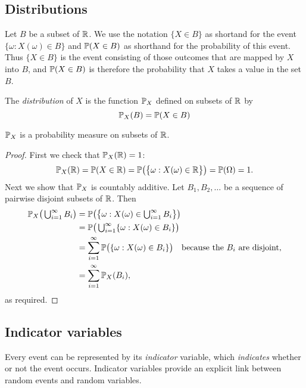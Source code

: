\subsection{Distributions}\label{ss:dist}

Let $B$ be a subset of $\mathbb{R}$. We use the notation $\{X\in B\}$ as shortand for the event $\{\omega: X(\omega)\in B\}$ and $\mathbb{P}(X\in B)$ as shorthand for the probability of this event. Thus $\{X\in B\}$ is the event consisting of those outcomes that are mapped by $X$ into $B$, and $\mathbb{P}(X\in B)$ is therefore the probability that $X$ takes a value in the set $B$.

\begin{definition}\label{def:distribution}
The \emph{distribution} of $X$ is the function $\mathbb{P}_X$ defined on subsets of $\mathbb{R}$ by 
\[
\mathbb{P}_X(B) = \mathbb{P}(X\in B) 
\]
\end{definition}

\begin{theorem}\label{th:distribution}
$\mathbb{P}_X$ is a probability measure on subsets of $\mathbb{R}$.
\begin{proof}
First we check that $\mathbb{P}_X(\mathbb{R}) = 1$:
\[
\mathbb{P}_X(\mathbb{R}) = \mathbb{P}(X\in\mathbb{R}) = \mathbb{P}\big(\big\{\omega:X(\omega)\in\mathbb{R}\big\}\big) = \mathbb{P}(\Omega) = 1. 
\]
Next we show that $\mathbb{P}_X$ is countably additive. Let $B_1,B_2,\ldots$ be a sequence of pairwise disjoint subsets of $\mathbb{R}$. Then
\begin{align*}
\mathbb{P}_X\big(\textstyle\bigcup_{i=1}^{\infty} B_i\big)
	& = \mathbb{P}\big(\big\{\omega : X(\omega)\in \textstyle\bigcup_{i=1}^{\infty} B_i\big\}\big) \\
	& = \mathbb{P}\big(\textstyle\bigcup_{i=1}^{\infty} \{\omega : X(\omega)\in B_i\}\big) \\
	& = \sum_{i=1}^{\infty} \mathbb{P}\big(\{\omega : X(\omega)\in B_i\}\big) \quad\text{because the $B_i$ are disjoint,} \\
	& = \sum_{i=1}^{\infty} \mathbb{P}_X(B_i),
\end{align*}
as required.
\end{proof}
\end{theorem}


\subsection{Indicator variables}
Every event can be represented by its \emph{indicator} variable, which \textit{indicates} whether or not the event occurs. Indicator variables provide an explicit link between random events and random variables. 

